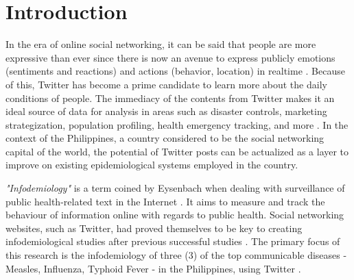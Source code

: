 \chapter{Introduction}

In the era of online social networking, it can be said that people are more expressive than ever since there is now an avenue to express publicly emotions (sentiments and reactions) and actions (behavior, location) in realtime \cite{deller2011twittering}. Because of this, Twitter has become a prime candidate to learn more about the daily conditions of people. The immediacy of the contents from Twitter makes it an ideal source of data for analysis in areas such as disaster controls, marketing strategization, population profiling, health emergency tracking, and more \cite{zeng2010social, ribarsky2014social}. In the context of the Philippines, a country considered to be the social networking capital of the world, the potential of Twitter posts can be actualized  as a layer to improve on existing epidemiological systems employed in the country.


\textit{"Infodemiology"} is a term coined by Eysenbach when dealing with surveillance of public health-related text in the Internet \cite{Eysenbach:2009aa}. It aims to measure and track the behaviour of information online with regards to public health. Social networking websites, such as Twitter, had proved themselves to be key to creating infodemiological studies after previous successful studies \cite{nascimento2014real, Chew:2010aa, Bragazzi:2013aa,eysenbach2006infodemiology}. The primary focus of this research is the infodemiology of three (3) of the top communicable diseases - Measles, Influenza, Typhoid Fever -  in the Philippines, using Twitter \cite{dohrecord2015}. 


